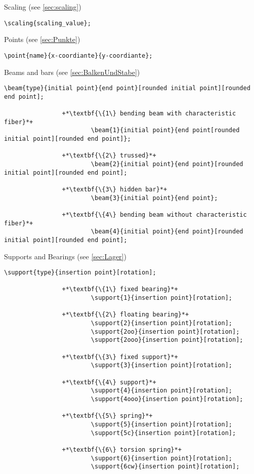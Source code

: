 \documentclass[%
  a4paper,
  BCOR20mm,
  pointlessnumbers,
  twoside,
  halfparskip,
  openright,
]{scrreprt}
\begin{document}
Scaling (see \ref{sec:scaling})

\begin{lstlisting}[emph={scaling},backgroundcolor=\color{white}]
		\scaling{scaling_value};
\end{lstlisting}\vspace{-10mm}

Points (see \ref{sec:Punkte})

\begin{lstlisting}[emph={point},backgroundcolor=\color{white}]
		\point{name}{x-coordiante}{y-coordiante};
\end{lstlisting}\vspace{-10mm}

Beams and bars (see \ref{sec:BalkenUndStabe})

\begin{lstlisting}[emph={beam},backgroundcolor=\color{white}]
		\beam{type}{initial point}{end point}[rounded initial point][rounded end point];
		
				+*\textbf{\{1\} bending beam with characteristic fiber}*+
						\beam{1}{initial point}{end point[rounded initial point][rounded end point]};
						
				+*\textbf{\{2\} trussed}*+
						\beam{2}{initial point}{end point}[rounded initial point][rounded end point];
						
				+*\textbf{\{3\} hidden bar}*+
						\beam{3}{initial point}{end point};
						
				+*\textbf{\{4\} bending beam without characteristic fiber}*+
						\beam{4}{initial point}{end point}[rounded initial point][rounded end point];										
\end{lstlisting}\vspace{-10mm}

Supports and Bearings (see \ref{sec:Lager})

\begin{lstlisting}[emph={support},backgroundcolor=\color{white}]
		\support{type}{insertion point}[rotation];
		
				+*\textbf{\{1\} fixed bearing}*+
						\support{1}{insertion point}[rotation];
						
				+*\textbf{\{2\} floating bearing}*+
						\support{2}{insertion point}[rotation];
						\support{2oo}{insertion point}[rotation];
						\support{2ooo}{insertion point}[rotation];
						
				+*\textbf{\{3\} fixed support}*+
						\support{3}{insertion point}[rotation];
						
				+*\textbf{\{4\} support}*+
						\support{4}{insertion point}[rotation];	
						\support{4ooo}{insertion point}[rotation];

				+*\textbf{\{5\} spring}*+
						\support{5}{insertion point}[rotation];	
						\support{5c}{insertion point}[rotation];

				+*\textbf{\{6\} torsion spring}*+
						\support{6}{insertion point}[rotation];	
						\support{6cw}{insertion point}[rotation];
\end{lstlisting}\vspace{-10mm}
\end{document}
